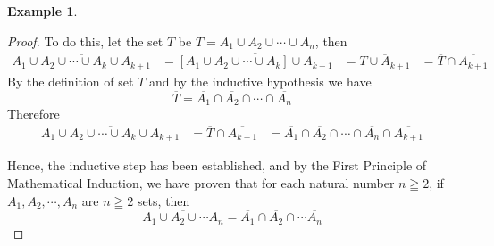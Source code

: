 \documentclass{book}
\theoremstyle{definition}
\newtheorem{example}{Example}[definition]
\theoremstyle{remark}
\begin{document}
\begin{example}
\begin{proof}
        To do this, let the set $T$ be $T = A_1 \cup A_2 \cup \cdots \cup A_n$, then
            \begin{align*}
                \overline{A_1 \cup A_2 \cup \cdots \cup A_k \cup A_{k+1}} & = \overline{[A_1 \cup A_2 \cup \cdots \cup A_k ] \cup A_{k+1}}
                    & = \overline{T \cup A_{k+1}}
                    & = \overline{T} \cap \overline{A_{k+1}}
            \end{align*}
        By the definition of set $T$ and by the inductive hypothesis we have
            \begin{equation*}
                \overline{T} = \overline{A_1} \cap \overline{A_2} \cap \cdots \cap \overline{A_n}
            \end{equation*}
        Therefore 
            \begin{align*}
                \overline{A_1 \cup A_2 \cup \cdots \cup A_k \cup A_{k+1}} & = \overline{T} \cap \overline{A_{k+1}} 
                    & = \overline{A_1} \cap \overline{A_2} \cap \cdots \cap \overline{A_n} \cap \overline{A_{k+1}} 
            \end{align*}
        
        Hence, the inductive step has been established, and by the First Principle of Mathematical Induction, we have proven that for each natural number $n \geqq 2$, if $A_1, A_2, \cdots, A_n$ are $n \geqq 2$ sets, then 
            \begin{equation*}
                \overline{A_1 \cup A_2 \cup \cdots A_n} = \overline{A_1} \cap \overline{A_2} \cap \cdots \overline{A_n}
            \end{equation*}
    \end{proof}
\end{example}
\end{document}

